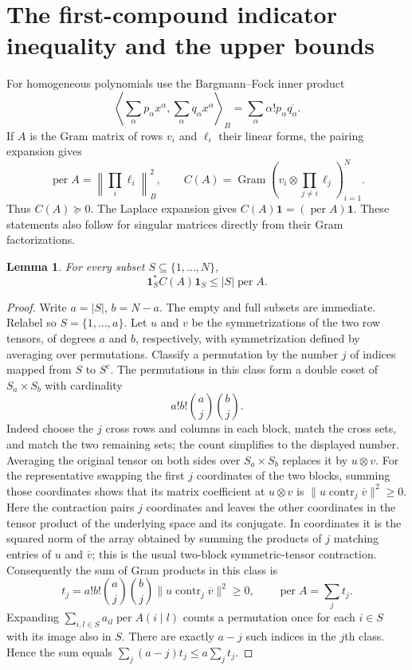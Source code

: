 \documentclass[11pt]{article}
\newtheorem{lemma}[theorem]{Lemma}
\DeclareMathOperator{\per}{per}
\newcommand{\contr}{\operatorname{contr}}
\newcommand{\one}{\mathbf 1}
\begin{document}
\section{The first-compound indicator inequality and the upper bounds}
For homogeneous polynomials use the Bargmann--Fock inner product
\[
 \left\langle\sum_\alpha p_\alpha x^\alpha,
 \sum_\alpha q_\alpha x^\alpha\right\rangle_B
 =\sum_\alpha\alpha!p_\alpha\overline{q_\alpha}.
\]
If $A$ is the Gram matrix of rows $v_i$ and $\ell_i$ their linear forms, the
pairing expansion gives
\begin{equation}\label{eq:fock}
 \per A=\left\|\prod_i\ell_i\right\|_B^2,
 \qquad C(A)=\operatorname{Gram}
 \left(v_i\otimes\prod_{j\ne i}\ell_j\right)_{i=1}^N.
\end{equation}
Thus $C(A)\succeq0$. The Laplace expansion gives $C(A)\one=(\per A)\one$.
These statements also follow for singular matrices directly from their Gram
factorizations.

\begin{lemma}\label{lem:indicator}
For every subset $S\subseteq\{1,\ldots,N\}$,
\[
 \one_S^*C(A)\one_S\le |S|\per A.
\]
\end{lemma}
\begin{proof}
Write $a=|S|$, $b=N-a$. The empty and full subsets are immediate. Relabel so
$S=\{1,\ldots,a\}$. Let $u$ and $v$ be the symmetrizations of the two row
tensors, of degrees $a$ and $b$, respectively, with symmetrization defined by
averaging over permutations. Classify a permutation by the number $j$ of
indices mapped from $S$ to $S^c$. The permutations in this class form a double
coset of $S_a\times S_b$ with cardinality
\[
 a!b!\binom aj\binom bj.
\]
Indeed choose the $j$ cross rows and columns in each block, match the cross
sets, and match the two remaining sets; the count simplifies to the displayed
number. Averaging the original tensor on both sides over $S_a\times S_b$
replaces it by $u\otimes v$. For the representative swapping the first $j$
coordinates of the two blocks, summing those coordinates shows that its
matrix coefficient at $u\otimes v$ is
$\|u\mathbin{\contr_j}\overline v\|^2\ge0$. Here the contraction pairs $j$
coordinates and leaves the other coordinates in the tensor product of the
underlying space and its conjugate. In coordinates it is the squared norm
of the array obtained by summing the products of $j$ matching entries of $u$
and $\overline v$; this is the usual two-block symmetric-tensor contraction.
Consequently the sum of Gram products in this class is
\[
 t_j=a!b!\binom aj\binom bj
       \|u\mathbin{\contr_j}\overline v\|^2\ge0,
 \qquad \per A=\sum_jt_j.
\]
Expanding $\sum_{i,l\in S}a_{il}\per A(i\mid l)$ counts a permutation once
for each $i\in S$ with its image also in $S$. There are exactly $a-j$ such
indices in the $j$th class. Hence the sum equals
$\sum_j(a-j)t_j\le a\sum_jt_j$.
\end{proof}
\end{document}
